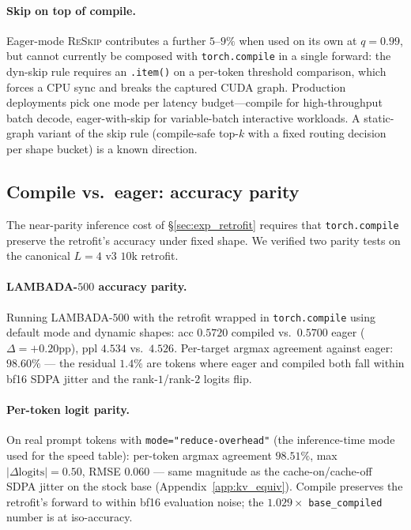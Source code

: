 \documentclass{article}
\newcommand{\reskip}{\textsc{ReSkip}}
\begin{document}
\paragraph{Skip on top of compile.} Eager-mode \reskip{} contributes a further $5$--$9\%$ when used on its own at $q{=}0.99$, but cannot currently be composed with \texttt{torch.compile} in a single forward: the dyn-skip rule requires an \texttt{.item()} on a per-token threshold comparison, which forces a CPU sync and breaks the captured CUDA graph. Production deployments pick one mode per latency budget---compile for high-throughput batch decode, eager-with-skip for variable-batch interactive workloads. A static-graph variant of the skip rule (compile-safe top-$k$ with a fixed routing decision per shape bucket) is a known direction.

\subsection{Compile vs.\ eager: accuracy parity}
\label{app:compile_accuracy}

The near-parity inference cost of \S\ref{sec:exp_retrofit} requires that \texttt{torch.compile} preserve the retrofit's accuracy under fixed shape. We verified two parity tests on the canonical $L{=}4$ v3 $10$k retrofit.

\paragraph{LAMBADA-$500$ accuracy parity.} Running LAMBADA-$500$ with the retrofit wrapped in \texttt{torch.compile} using default mode and dynamic shapes: acc $0.5720$ compiled vs.\ $0.5700$ eager ($\Delta{=}+0.20$pp), ppl $4.534$ vs.\ $4.526$. Per-target argmax agreement against eager: $98.60\%$ — the residual $1.4\%$ are tokens where eager and compiled both fall within bf16 SDPA jitter and the rank-$1$/rank-$2$ logits flip.

\paragraph{Per-token logit parity.} On real prompt tokens with \texttt{mode="reduce-overhead"} (the inference-time mode used for the speed table): per-token argmax agreement $98.51\%$, max $|\Delta\text{logits}|=0.50$, RMSE $0.060$ — same magnitude as the cache-on/cache-off SDPA jitter on the stock base (Appendix~\ref{app:kv_equiv}). Compile preserves the retrofit's forward to within bf16 evaluation noise; the $1.029\times$ \texttt{base\_compiled} number is at iso-accuracy.
\end{document}
